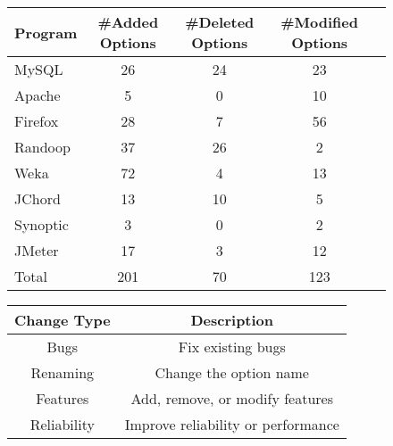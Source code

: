 \begin{figure}[t]
\vspace{1mm}
\centering
\small{
\setlength{\tabcolsep}{.50\tabcolsep}
\begin{tabular}{|l||c|c|c|c|}
\hline
 Program & \#Added Options & \#Deleted Options& \#Modified Options\\
 \hline
 \hline
 MySQL& 26 & 24 & 23 \\
 Apache & 5 & 0 & 10 \\
 Firefox& 28 & 7 & 56 \\
 Randoop & 37  & 26 & 2\\
 Weka &  72 & 4 & 13 \\
 JChord & 13  & 10 & 5 \\
 Synoptic & 3 & 0 & 2 \\
 JMeter & 17  & 3 &  12 \\
\hline
\hline
 Total & 201 & 70 & 123 \\
\hline
\end{tabular}
}
\vspace{-2mm}
\end{figure}


\begin{figure}[t]
\vspace{1mm}
\centering
\small{
\setlength{\tabcolsep}{.50\tabcolsep}
\begin{tabular}{|c|c|}
\hline
 \textbf{Change Type} & \textbf{Description} \\
 \hline
 \hline
Bugs & Fix existing bugs\\
 \hline
Renaming & Change the option name\\
 \hline
Features & Add, remove, or modify features\\
 \hline
Reliability & Improve reliability or performance\\
\hline
\end{tabular}
}
\vspace{-2mm}
\end{figure}

